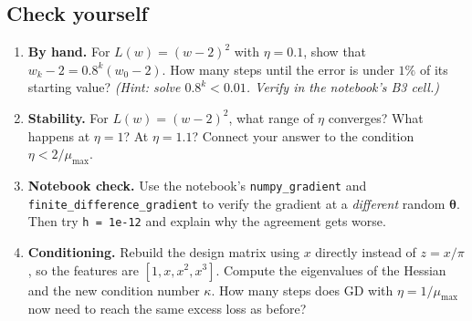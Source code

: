 \documentclass[11pt]{article}
\newcommand{\vth}{\bm{\theta}}
\begin{document}
\subsection*{Check yourself}
\begin{enumerate}
  \item \textbf{By hand.} For $L(w)=(w-2)^2$ with $\eta=0.1$, show that $w_k-2=0.8^k(w_0-2)$. How many steps until the error is under $1\%$ of its starting value? \textit{(Hint: solve $0.8^k<0.01$. Verify in the notebook's B3 cell.)}
  \item \textbf{Stability.} For $L(w)=(w-2)^2$, what range of $\eta$ converges? What happens at $\eta=1$? At $\eta=1.1$? Connect your answer to the condition $\eta<2/\mu_{\max}$.
  \item \textbf{Notebook check.} Use the notebook's \texttt{numpy\_gradient} and \texttt{finite\_difference\_gradient} to verify the gradient at a \emph{different} random $\vth$. Then try \texttt{h = 1e-12} and explain why the agreement gets worse.
  \item \textbf{Conditioning.} Rebuild the design matrix using $x$ directly instead of $z=x/\pi$, so the features are $[1,x,x^2,x^3]$. Compute the eigenvalues of the Hessian and the new condition number $\kappa$. How many steps does GD with $\eta=1/\mu_{\max}$ now need to reach the same excess loss as before?
\end{enumerate}
\end{document}
